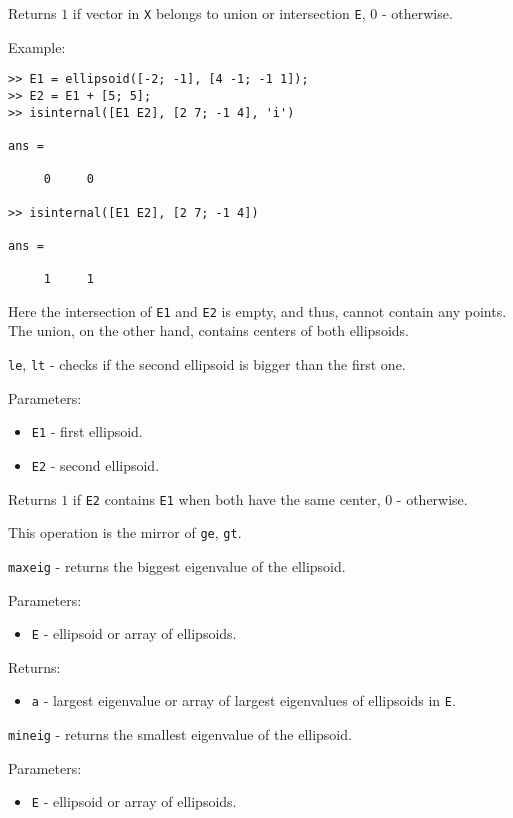 Returns $1$ if vector in {\tt X} belongs to union or intersection {\tt E},
$0$ - otherwise.

Example:
{\tt \begin{verbatim}
>> E1 = ellipsoid([-2; -1], [4 -1; -1 1]);
>> E2 = E1 + [5; 5];
>> isinternal([E1 E2], [2 7; -1 4], 'i')

ans =

     0     0

>> isinternal([E1 E2], [2 7; -1 4])

ans =

     1     1
\end{verbatim} }
Here the intersection of {\tt E1} and {\tt E2} is empty, and thus, cannot
contain any points. The union, on the other hand, contains centers
of both ellipsoids.

\newpage

{\Large {\tt le}}, {\Large {\tt lt}} - checks if the second ellipsoid is bigger
than the first one.

Parameters:
\begin{itemize}
\item {\tt E1} - first ellipsoid.
\item {\tt E2} - second ellipsoid.
\end{itemize}

Returns $1$ if {\tt E2} contains {\tt E1} when both have the same center,
$0$ - otherwise.

This operation is the mirror of {\tt ge}, {\tt gt}.

\newpage

{\Large {\tt maxeig}} - returns the biggest eigenvalue of the ellipsoid.

Parameters:
\begin{itemize}
\item {\tt E} - ellipsoid or array of ellipsoids.
\end{itemize}

Returns:
\begin{itemize}
\item {\tt a} - largest eigenvalue or array of largest eigenvalues of
ellipsoids in {\tt E}.
\end{itemize}

\newpage

{\Large {\tt mineig}} - returns the smallest eigenvalue of the ellipsoid.

Parameters:
\begin{itemize}
\item {\tt E} - ellipsoid or array of ellipsoids.
\end{itemize}

